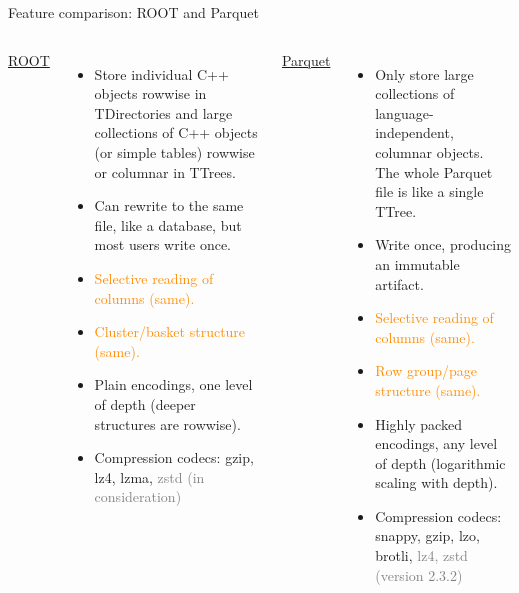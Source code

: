 \documentclass[aspectratio=169]{beamer}
\begin{document}
\begin{frame}{Feature comparison: ROOT and Parquet}
\vspace{0.5 cm}
\begin{columns}[t]
{\large \underline{ROOT}}

\begin{itemize}
\item Store individual C++ objects rowwise in TDirectories and large collections of C++ objects (or simple tables) rowwise or columnar in TTrees.
\item Can rewrite to the same file, like a database, but most users write once.
\item \textcolor{darkorange}{Selective reading of columns (same).}
\item \textcolor{darkorange}{Cluster/basket structure (same).}
\item Plain encodings, one level of depth (deeper structures are rowwise).
\item Compression codecs: gzip, lz4, lzma, \textcolor{gray}{zstd (in consideration)}
\end{itemize}

{\large \underline{Parquet}}

\begin{itemize}
\item Only store large collections of language-independent, columnar objects. The whole Parquet file is like a single TTree.
\item Write once, producing an immutable artifact.
\item \textcolor{darkorange}{Selective reading of columns (same).}
\item \textcolor{darkorange}{Row group/page structure (same).}
\item Highly packed encodings, any level of depth (logarithmic scaling with depth).
\item Compression codecs: snappy, gzip, lzo, brotli, \textcolor{gray}{lz4, zstd (version 2.3.2)}
\end{itemize}
\end{columns}
\end{frame}
\end{document}
